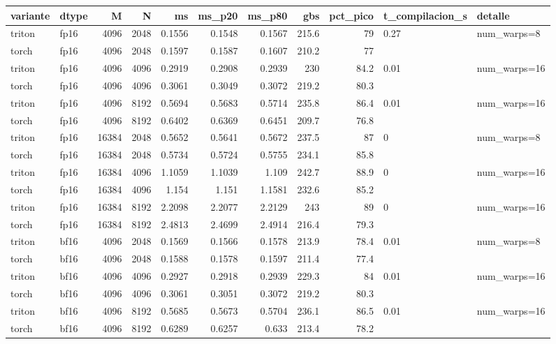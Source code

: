 \begin{table}[htbp]
  \centering\small
  \begin{tabular}{llrrrrrrrll}
    \toprule
    variante & dtype & M & N & ms & ms\_p20 & ms\_p80 & gbs & pct\_pico & t\_compilacion\_s & detalle \\
    \midrule
    triton & fp16 & 4096 & 2048 & 0.1556 & 0.1548 & 0.1567 & 215.6 & 79 & 0.27 & num\_warps=8 \\
    torch & fp16 & 4096 & 2048 & 0.1597 & 0.1587 & 0.1607 & 210.2 & 77 &  &  \\
    triton & fp16 & 4096 & 4096 & 0.2919 & 0.2908 & 0.2939 & 230 & 84.2 & 0.01 & num\_warps=16 \\
    torch & fp16 & 4096 & 4096 & 0.3061 & 0.3049 & 0.3072 & 219.2 & 80.3 &  &  \\
    triton & fp16 & 4096 & 8192 & 0.5694 & 0.5683 & 0.5714 & 235.8 & 86.4 & 0.01 & num\_warps=16 \\
    torch & fp16 & 4096 & 8192 & 0.6402 & 0.6369 & 0.6451 & 209.7 & 76.8 &  &  \\
    triton & fp16 & 16384 & 2048 & 0.5652 & 0.5641 & 0.5672 & 237.5 & 87 & 0 & num\_warps=8 \\
    torch & fp16 & 16384 & 2048 & 0.5734 & 0.5724 & 0.5755 & 234.1 & 85.8 &  &  \\
    triton & fp16 & 16384 & 4096 & 1.1059 & 1.1039 & 1.109 & 242.7 & 88.9 & 0 & num\_warps=16 \\
    torch & fp16 & 16384 & 4096 & 1.154 & 1.151 & 1.1581 & 232.6 & 85.2 &  &  \\
    triton & fp16 & 16384 & 8192 & 2.2098 & 2.2077 & 2.2129 & 243 & 89 & 0 & num\_warps=16 \\
    torch & fp16 & 16384 & 8192 & 2.4813 & 2.4699 & 2.4914 & 216.4 & 79.3 &  &  \\
    triton & bf16 & 4096 & 2048 & 0.1569 & 0.1566 & 0.1578 & 213.9 & 78.4 & 0.01 & num\_warps=8 \\
    torch & bf16 & 4096 & 2048 & 0.1588 & 0.1578 & 0.1597 & 211.4 & 77.4 &  &  \\
    triton & bf16 & 4096 & 4096 & 0.2927 & 0.2918 & 0.2939 & 229.3 & 84 & 0.01 & num\_warps=16 \\
    torch & bf16 & 4096 & 4096 & 0.3061 & 0.3051 & 0.3072 & 219.2 & 80.3 &  &  \\
    triton & bf16 & 4096 & 8192 & 0.5685 & 0.5673 & 0.5704 & 236.1 & 86.5 & 0.01 & num\_warps=16 \\
    torch & bf16 & 4096 & 8192 & 0.6289 & 0.6257 & 0.633 & 213.4 & 78.2 &  &  \\

\end{tabular}
\end{table}
